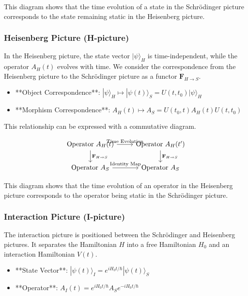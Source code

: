 \documentclass[uplatex,a4j,12pt,dvipdfmx]{jsarticle}
\begin{document}
This diagram shows that the time evolution of a state in the Schrödinger picture corresponds to the state remaining static in the Heisenberg picture.



\subsubsection{Heisenberg Picture (H-picture)}

In the Heisenberg picture, the state vector $|\psi\rangle_H$ is time-independent, while the operator $A_H(t)$ evolves with time. We consider the correspondence from the Heisenberg picture to the Schrödinger picture as a functor $\mathbf{F}_{H \to S}$.

\begin{itemize}
	\item **Object Correspondence**:
	  $|\psi\rangle_H \mapsto |\psi(t)\rangle_S = U(t, t_0)|\psi\rangle_H$
	\item **Morphism Correspondence**:
	  $A_H(t) \mapsto A_S = U(t_0, t)A_H(t)U(t, t_0)$
\end{itemize}

This relationship can be expressed with a commutative diagram.

$$
	\begin{tikzcd}
		\text{Operator } A_H(t) \arrow[r, "\text{Time Evolution}"] \arrow[d, "\mathbf{F}_{H \to S}"] & \text{Operator } A_H(t') \arrow[d, "\mathbf{F}_{H \to S}"] \\
		\text{Operator } A_S \arrow[r, "\text{Identity Map}"] & \text{Operator } A_S
	\end{tikzcd}
$$

This diagram shows that the time evolution of an operator in the Heisenberg picture corresponds to the operator being static in the Schrödinger picture.



\subsubsection{Interaction Picture (I-picture)}

The interaction picture is positioned between the Schrödinger and Heisenberg pictures. It separates the Hamiltonian $H$ into a free Hamiltonian $H_0$ and an interaction Hamiltonian $V(t)$.

\begin{itemize}
	\item **State Vector**: $|\psi(t)\rangle_I = e^{iH_0 t/\hbar}|\psi(t)\rangle_S$
	\item **Operator**: $A_I(t) = e^{iH_0 t/\hbar}A_S e^{-iH_0 t/\hbar}$
\end{itemize}
\end{document}
